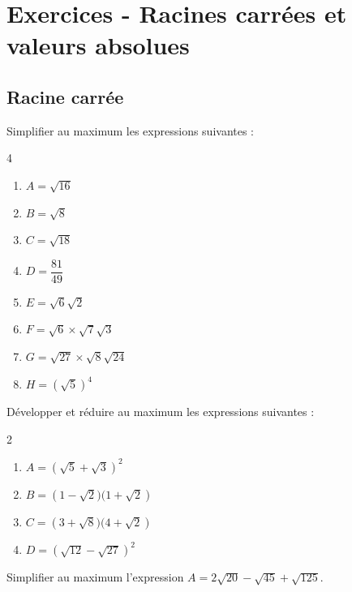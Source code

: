 \section*{Exercices - Racines carrées et valeurs absolues}
{\setlength{\columnseprule}{0pt}
\setcounter{NumEx}{1}


\subsection*{Racine carrée}
\begin{Exercice}
Simplifier au maximum les expressions suivantes :
\vspace{-0.5cm}
\begin{multicols}{4}
\begin{enumerate}
    \item $A = \sqrt{16}$
    \item $B = \sqrt{8}$
    \item $C = \sqrt{18}$
    \item $D = \dfrac{81}{49}$
    \item $E = \sqrt{6} \sqrt{2}$
    \item $F = \sqrt{6} \times \sqrt{7} \sqrt{3}$
    \item $G = \sqrt{27} \times \sqrt{8} \sqrt{24}$
    \item $H = (\sqrt{5})^4$
\end{enumerate}
\end{multicols}
\end{Exercice}

\begin{Exercice}
Développer et réduire au maximum les expressions suivantes :
\vspace{-0.5cm}
\begin{multicols}{2}
\begin{enumerate}
    \item $A = \left( \sqrt{5} + \sqrt{3} \right)  ^2$
    \item $B = \left( 1 - \sqrt{2})(1 + \sqrt{2} \right) $
    \item $C = \left( 3 + \sqrt{8})(4 + \sqrt{2} \right) $
    \item $D = \left( \sqrt{12} - \sqrt{27} \right) ^2$
\end{enumerate}
\end{multicols}
\end{Exercice}

\begin{Exercice}
Simplifier au maximum l’expression $A = 2\sqrt{20} - \sqrt{45} + \sqrt{125}$.
\end{Exercice}



}
